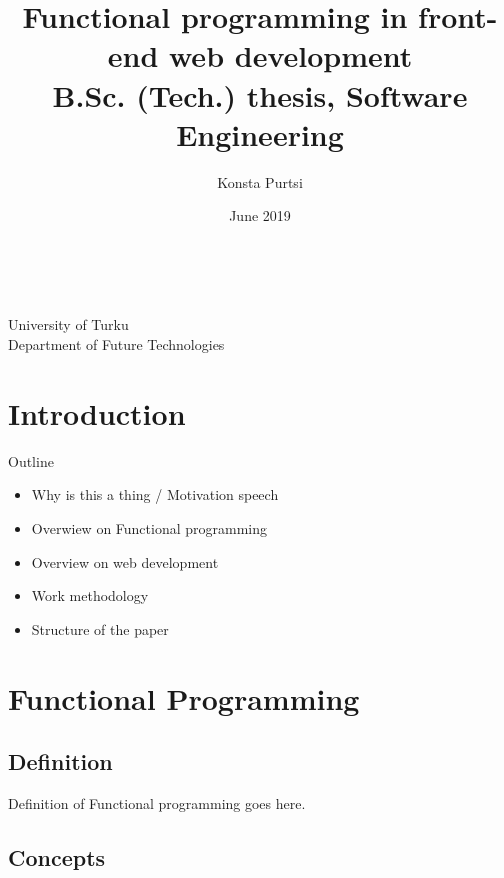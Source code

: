 \documentclass[12pt, titlepage]{article}
\title{Functional programming in front-end web development \\ {\normalsize
B.Sc. (Tech.) thesis, Software Engineering}}
\author{Konsta Purtsi}
\date{June 2019}
\makeatletter
\let\inserttitle\@title
\let\insertauthor\@author
\let\insertdate\@date
\makeatother
\begin{document}
\pagestyle{empty}

\vspace*{\fill}
\begin{center}\Large %
\inserttitle
\end{center}

\vspace{0.3cm}
\begin{center}
\insertauthor \\
\insertdate
\end{center}

\vfill
\begin{center}
University of Turku\\
Department of Future Technologies
\end{center}

\begin{center} %
\end{center}

\newpage
\tableofcontents

\newpage

\pagestyle{plain}
\setcounter{page}{1}

\section{Introduction}
Outline
\begin{itemize}
    \item Why is this a thing / Motivation speech
    \item Overwiew on Functional programming
    \item Overview on web development
    \item Work methodology
    \item Structure of the paper
\end{itemize}

\section{Functional Programming}

\subsection{Definition}
Definition of Functional programming goes here.

\subsection{Concepts}
\end{document}
